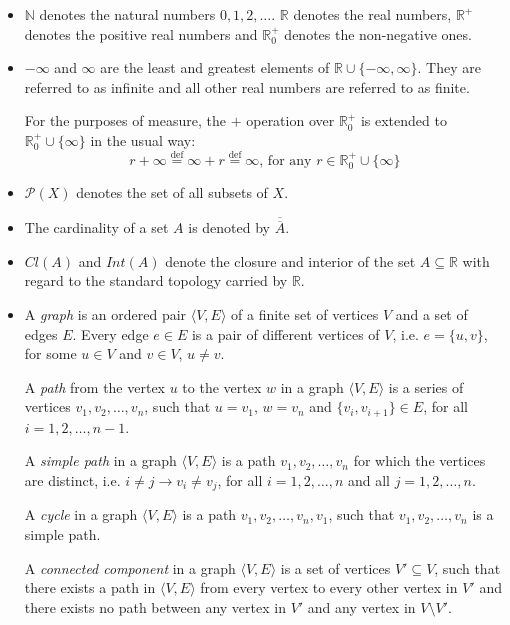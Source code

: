\documentclass{article}
\newcommand{\card}[1]{\overline{\overline{#1}}}
\newcommand{\R}{\mathbb{R}}
\newcommand{\N}{\mathbb{N}}
\newcommand{\pwrset}{\mathcal{P}}
\newcommand{\eqdef}{\stackrel{\text{def}}{=}}
\begin{document}
\begin{itemize}
\item $\N$ denotes the natural numbers $0, 1, 2, \dots$. $\R$ denotes the real numbers, $\R^+$ denotes the positive real numbers and $\R^+_0$ denotes the non-negative ones.

\item $-\infty$ and $\infty$ are the least and greatest elements of $\R \cup \{-\infty, \infty\}$. They are referred to as infinite and all other real numbers are referred to as finite.

  For the purposes of measure, the $+$ operation over $\R^+_0$ is extended to $\R^+_0 \cup \{\infty\}$ in the usual way:
  \begin{equation*}
    r + \infty \eqdef \infty + r \eqdef \infty \text{, for any } r \in \R^+_0 \cup \{\infty\}
  \end{equation*}

\item $\pwrset(X)$ denotes the set of all subsets of $X$.

\item The cardinality of a set $A$ is denoted by $\card{A}$.

\item $Cl(A)$ and $Int(A)$ denote the closure and interior of the set $A \subseteq \R$ with regard to the standard topology carried by $\R$.

\item A \emph{graph} is an ordered pair $\langle V, E \rangle$ of a finite set of vertices $V$ and a set of edges $E$. Every edge $e \in E$ is a pair of different vertices of $V$, i.e. $e = \{u, v\}$, for some $u \in V$ and $v \in V$, $u \neq v$.

  A \emph{path} from the vertex $u$ to the vertex $w$ in a graph $\langle V, E \rangle$ is a series of vertices $v_1, v_2, \dots, v_n$, such that $u = v_1$, $w = v_n$ and $\{v_i, v_{i+1}\} \in E$, for all $i = 1, 2, \dots, n - 1$.

  A \emph{simple path} in a graph $\langle V, E \rangle$ is a path $v_1, v_2, \dots, v_n$ for which the vertices are distinct, i.e. $i \neq j \rightarrow v_i \neq v_j$, for all $i = 1, 2, \dots, n$ and all $j = 1, 2, \dots, n$.

  A \emph{cycle} in a graph $\langle V, E \rangle$ is a path $v_1, v_2, \dots, v_n, v_1$, such that $v_1, v_2, \dots, v_n$ is a simple path.

  A \emph{connected component} in a graph $\langle V, E \rangle$ is a set of vertices $V' \subseteq V$, such that there exists a path in $\langle V, E \rangle$ from every vertex to every other vertex in $V'$ and there exists no path between any vertex in $V'$ and any vertex in $V \setminus V'$.


\end{itemize}
\end{document}
